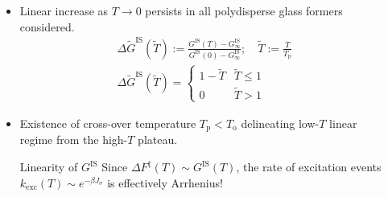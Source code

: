 \begin{frame}[c]
\begin{columns}[c]
\begin{column}[T]{0.5\textwidth}
\end{column}

\begin{column}[T]{0.5\textwidth}
\begin{itemize}
    \item<2-> Linear increase as $T\to 0$ persists in all polydisperse glass formers considered.  
    {    
    \begin{gather*}
    \Delta \widetilde{G}^\mathrm{IS}\left(\tilde{T}\right) := \frac{G^\mathrm{IS}(T)-G^\mathrm{IS}_\infty}{G^\mathrm{IS}(0)-G^\mathrm{IS}_\infty} ; \quad \tilde{T} := \frac{T}{T_\mathrm{p}}
    \\
    \Delta \widetilde{G}^\mathrm{IS}\left(\tilde{T}\right) = \begin{cases}
    1-\tilde{T}  & \tilde{T} \leq 1
    \\
    0 & \tilde{T} > 1
    \end{cases} \label{eq:subtractedgis}
    \end{gather*}
    }
    \item<4-> Existence of cross-over temperature $T_\mathrm{p} < T_\mathrm{o}$ delineating low-$T$ linear regime from the high-$T$ plateau. 
    {
    \begin{block}{\centering Linearity of $G^\mathrm{IS}$}
    Since $\Delta F^\ddagger(T) \sim G^\mathrm{IS}(T)$, the rate of excitation events $k_\mathrm{exc}(T) \sim e^{-\beta J_\sigma} $ is effectively Arrhenius!
    \end{block}
    }
\end{itemize}
\end{column}

\end{columns}
    
\end{frame} 